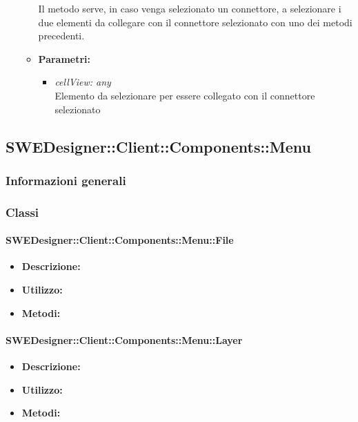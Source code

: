 \begin{itemize}
\begin{itemize}
          				Il metodo serve, in caso venga selezionato un connettore, a selezionare i due elementi da collegare con il connettore selezionato con uno dei metodi precedenti.
          				\item \textbf{Parametri:}\\
            				\begin{itemize}
            					\item \emph{cellView: any}\\
            					Elemento da selezionare per essere collegato con il connettore selezionato
            				\end{itemize}
          			\end{itemize}
          		\end{itemize}
	\subsection{SWEDesigner::Client::Components::Menu}
		\subsubsection{Informazioni generali}
		\subsubsection{Classi}
			\paragraph{SWEDesigner::Client::Components::Menu::File}
				\begin{itemize}
          			\item \textbf{Descrizione:}\\
          			\item \textbf{Utilizzo:}\\
          			\item \textbf{Metodi:}\\
          		\end{itemize}
			\paragraph{SWEDesigner::Client::Components::Menu::Layer}
				\begin{itemize}
          			\item \textbf{Descrizione:}\\
          			\item \textbf{Utilizzo:}\\
          			\item \textbf{Metodi:}\\
          		\end{itemize}
